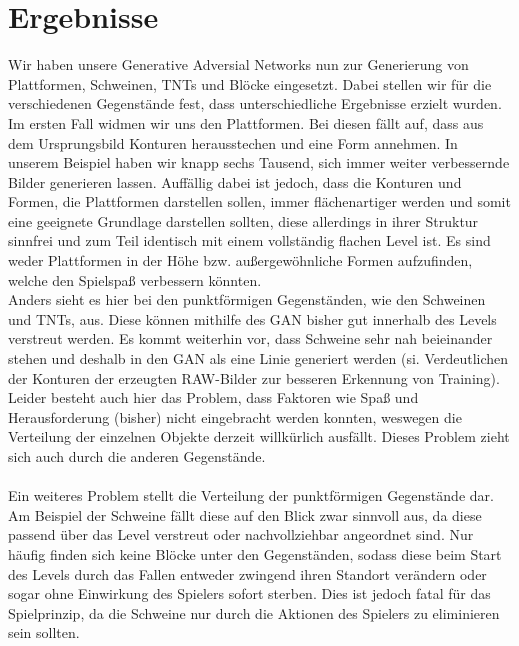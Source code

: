 
\section{Ergebnisse}
Wir haben unsere Generative Adversial Networks nun zur Generierung von Plattformen, Schweinen, TNTs und Blöcke eingesetzt. Dabei stellen wir für die verschiedenen Gegenstände fest, dass unterschiedliche Ergebnisse erzielt wurden. Im ersten Fall widmen wir uns den Plattformen. Bei diesen fällt auf, dass aus dem Ursprungsbild Konturen herausstechen und eine Form annehmen. In unserem Beispiel haben wir knapp sechs Tausend, sich immer weiter verbessernde Bilder generieren lassen. Auffällig dabei ist jedoch, dass die Konturen und Formen, die Plattformen darstellen sollen, immer flächenartiger werden und somit eine geeignete Grundlage darstellen sollten, diese allerdings in ihrer Struktur sinnfrei und zum Teil identisch mit einem vollständig flachen Level ist. Es sind weder Plattformen in der Höhe bzw. außergewöhnliche Formen aufzufinden, welche den Spielspaß verbessern könnten. \\ Anders sieht es hier bei den punktförmigen Gegenständen, wie den Schweinen und TNTs, aus. Diese können mithilfe des GAN bisher gut innerhalb des Levels verstreut werden. Es kommt weiterhin vor, dass Schweine sehr nah beieinander stehen und deshalb in den GAN als eine Linie generiert werden (si. Verdeutlichen der Konturen der erzeugten RAW-Bilder zur besseren Erkennung von Training). Leider besteht auch hier das Problem, dass Faktoren wie Spaß und Herausforderung (bisher) nicht eingebracht werden konnten, weswegen die Verteilung der einzelnen Objekte derzeit willkürlich ausfällt. Dieses Problem zieht sich auch durch die anderen Gegenstände. \\ \\Ein weiteres Problem stellt die Verteilung der punktförmigen Gegenstände dar. Am Beispiel der Schweine fällt diese auf den Blick zwar sinnvoll aus, da diese passend über das Level verstreut oder nachvollziehbar angeordnet sind. Nur häufig finden sich keine Blöcke unter den Gegenständen, sodass diese beim Start des Levels durch das Fallen entweder zwingend ihren Standort verändern oder sogar ohne Einwirkung des Spielers sofort sterben. Dies ist jedoch fatal für das Spielprinzip, da die Schweine nur durch die Aktionen des Spielers zu eliminieren sein sollten.
